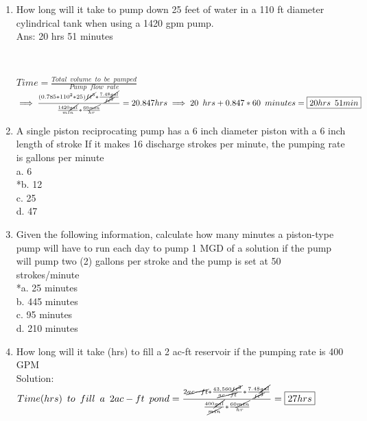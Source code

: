 \documentclass{article}
\begin{document}
\begin{enumerate}
\item How long will it take to pump down 25 feet of water in a 110 ft diameter cylindrical tank when using a 1420 gpm pump.\\  Ans:  20 hrs 51 minutes
\begin{center}
\\
\end{center}
$Time=\frac{Total \enspace volume \enspace to \enspace be \enspace pumped}{Pump \enspace flow \enspace rate}$\\
\vspace{0.3cm}
$\implies \frac{(0.785*110^2*25)\cancel{ft^3}*\frac{7.48\cancel{gal}}{\cancel{ft^3}}}{\frac{1420\cancel{gal}}{min}*\frac{60\cancel{min}}{hr}}=20.847hrs \implies 20 \enspace hrs + 0.847*60 \enspace minutes = \boxed{20hrs \enspace 51 min}$
\item A single piston reciprocating pump has a 6 inch diameter piston with a 6 inch length of stroke If it makes 16 discharge strokes per minute, the pumping rate is gallons per minute\\
a. 6\\
*b. 12\\
c. 25\\
d. 47\\

\item Given the following information, calculate how many minutes a piston-type pump will have to run each day to pump 1 MGD of a solution if the pump will pump two (2) gallons per stroke and the pump is set at 50 strokes/minute\\
*a. 25 minutes\\
b. 445 minutes\\
c. 95 minutes\\
d. 210 minutes\\

\item How long will it take (hrs) to fill a 2 ac-ft reservoir if the pumping rate is 400 GPM\\
Solution:\\
$Time (hrs)\enspace to \enspace fill \enspace a \enspace 2ac-ft \enspace pond=\frac{2 \cancel{ac-ft}*\frac{43,560\cancel{ft^3}}{\cancel{ac-ft}}*\frac{7.48\cancel{gal}}{\cancel{ft^3}}}{\frac{400\cancel{gal}}{\cancel{min}}*{\frac{60\cancel{min}}{hr}}}=\boxed{27hrs}$



\end{enumerate}
\end{document}
